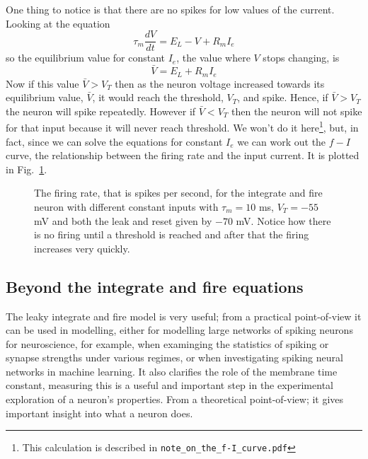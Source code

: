 \documentclass{article}
\begin{document}
One thing to notice is that there are no spikes for low values of the current. Looking at the equation 
\begin{equation}
\tau_m\frac{dV}{dt}=E_L-V+R_mI_e
\end{equation}
so the equilibrium value for constant $I_e$, the value where $V$ stops changing, is
\begin{equation}
\bar{V}=E_L+R_mI_e
\end{equation}
Now if this value $\bar{V}>V_T$ then as the neuron voltage increased
towards its equilibrium value, $\bar{V}$, it would reach the
threshold, $V_T$, and spike. Hence, if $\bar{V}>V_T$ the neuron will
spike repeatedly.  However if $\bar{V}<V_T$ then the neuron will not
spike for that input because it will never reach threshold. We won't do it here\footnote{This calculation is described in \texttt{note\_on\_the\_f-I\_curve.pdf}}, but, in fact, since we can
solve the equations for constant $I_e$ we can work out the $f-I$
curve, the relationship between the firing rate and the input
current. It is plotted in Fig.~\ref{f_i_curve}.


\begin{figure}
\begin{center}

\end{center}
\caption{The firing rate, that is spikes per second, for the integrate
  and fire neuron with different constant inputs with $\tau_m=10$ ms,
  $V_T=-55$ mV and both the leak and reset given by $-70$ mV. Notice
  how there is no firing until a threshold is reached and after that
  the firing increases very quickly. \label{f_i_curve}}
\end{figure}

\subsection*{Beyond the integrate and fire equations}

The leaky integrate and fire model is very useful; from a practical
point-of-view it can be used in modelling, either for modelling large
networks of spiking neurons for neuroscience, for example, when
examinging the statistics of spiking or synapse strengths under
various regimes, or when investigating spiking neural networks in
machine learning. It also clarifies the role of the membrane time
constant, measuring this is a useful and important step in the
experimental exploration of a neuron's properties. From a theoretical
point-of-view; it gives important insight into what a neuron does.
\end{document}
